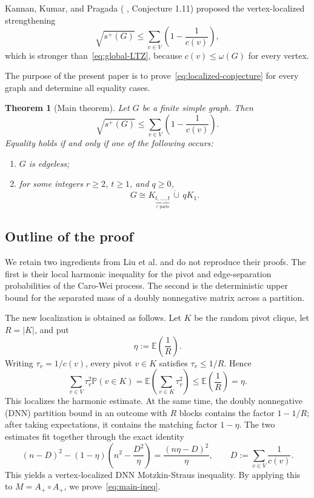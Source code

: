 \documentclass[11pt]{article}
\numberwithin{equation}{section}
\newtheorem{theorem}{Theorem}[section]
\theoremstyle{definition}
\theoremstyle{remark}
\newcommand{\splus}{s^{+}}
\newcommand{\E}{\mathbb E}
\newcommand{\Prob}{\mathbb P}
\newcommand{\PhiG}{\Phi(G)}
\begin{document}
	Kannan, Kumar, and Pragada ( \cite{kannan2025localizationspectralturantypetheorems}, Conjecture 1.11) proposed the vertex-localized strengthening
	\begin{equation}\label{eq:localized-conjecture}
		\sqrt{\splus(G)}\leq \sum_{v\in V}\left(1-\frac1{c(v)}\right),
	\end{equation}
	which is stronger than~\eqref{eq:global-LTZ}, because
	$c(v)\leq\omega(G)$ for every vertex.  
	
	The purpose of the present paper is
	to prove~\eqref{eq:localized-conjecture} for every graph and determine all
	equality cases. 
	
	\begin{theorem}[Main theorem]\label{thm:main}
		Let $G$ be a finite simple graph.  Then
		\begin{equation}\label{eq:main-ineq}
			\sqrt{\splus(G)}
			\leq
			\sum_{v\in V}\left(1-\frac1{c(v)}\right).
		\end{equation}
		Equality holds if and only if one of the following occurs:
		\begin{enumerate}[label=\textup{(\roman*)}]
			\item $G$ is edgeless;
			\item for some integers $r\geq2$, $t\geq1$, and $q\geq0$,
			\[
			G\cong K_{\underbrace{t,\ldots,t}_{r\text{ parts}}}\,\dot\cup\,qK_1.
			\]
		\end{enumerate}
		
	\end{theorem}
	
	\subsection*{Outline of the proof}
	We retain two ingredients from Liu et al. and do not reproduce
	their proofs.  The first is their local harmonic inequality for the pivot
	and edge-separation probabilities of the Caro-Wei process.  The second is
	the deterministic upper bound for the separated mass of a doubly
	nonnegative matrix across a partition.
	
	
	
	The new localization is obtained as follows.  Let $K$ be the random pivot
	clique, let $R=|K|$, and put
	\[
	\eta:=\E\left(\frac1R\right).
	\]
	Writing $\tau_v=1/c(v)$, every pivot $v\in K$ satisfies
	$\tau_v\leq1/R$.  Hence
	\[
	\sum_{v\in V}\tau_v^2\Prob(v\in K)
	=
	\E\left(\sum_{v\in K}\tau_v^2\right)
	\leq
	\E\left(\frac1R\right)=\eta.
	\]
	This localizes the harmonic estimate.  At the same time, the doubly nonnegative (DNN)
	partition bound in an outcome with $R$ blocks contains the factor
	$1-1/R$; after taking expectations, it contains the matching factor
	$1-\eta$.  The two estimates fit together through the exact identity
	\[
	(n-D)^2-(1-\eta)\left(n^2-\frac{D^2}{\eta}\right)
	=\frac{(n\eta-D)^2}{\eta},
	\qquad
	D:=\sum_{v\in V}\frac1{c(v)}.
	\]
	This yields a vertex-localized DNN Motzkin-Straus inequality. By applying
	this to $M=A_+\circ A_+$, we prove~\eqref{eq:main-ineq}.
	
\end{document}
